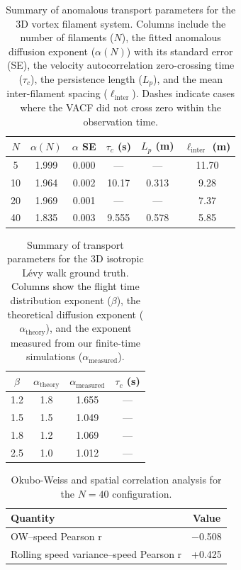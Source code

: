 \documentclass[]{article}
\begin{document}
\begin{table}[h!]
\centering
\caption{Summary of anomalous transport parameters for the 3D vortex filament system. Columns include the number of filaments ($N$), the fitted anomalous diffusion exponent ($\alpha(N)$) with its standard error (SE), the velocity autocorrelation zero-crossing time ($\tau_c$), the persistence length ($L_p$), and the mean inter-filament spacing ($\ell_{\text{inter}}$). Dashes indicate cases where the VACF did not cross zero within the observation time.}
\label{tab:params_vortex}
\begin{tabular}{cccccc}
\hline
$N$ & $\alpha(N)$ & $\alpha$ SE & $\tau_c$ (s) & $L_p$ (m) & $\ell_{\text{inter}}$ (m) \\
\hline
5  & 1.999 & 0.000 & —     & —     & 11.70 \\
10 & 1.964 & 0.002 & 10.17 & 0.313 & 9.28  \\
20 & 1.969 & 0.001 & —     & —     & 7.37  \\
40 & 1.835 & 0.003 & 9.555 & 0.578 & 5.85  \\
\hline
\end{tabular}
\end{table}

\begin{table}[h!]
\centering
\caption{Summary of transport parameters for the 3D isotropic L\'evy walk ground truth. Columns show the flight time distribution exponent ($\beta$), the theoretical diffusion exponent ($\alpha_{\text{theory}}$), and the exponent measured from our finite-time simulations ($\alpha_{\text{measured}}$).}
\label{tab:params_levy}
\begin{tabular}{cccc}
\hline
$\beta$ & $\alpha_{\text{theory}}$ & $\alpha_{\text{measured}}$ & $\tau_c$ (s) \\
\hline
1.2 & 1.8 & 1.655 & — \\
1.5 & 1.5 & 1.049 & — \\
1.8 & 1.2 & 1.069 & — \\
2.5 & 1.0 & 1.012 & — \\
\hline
\end{tabular}
\end{table}

\begin{table}[h!]
\centering
\caption{Okubo-Weiss and spatial correlation analysis for the $N=40$ configuration.}
\label{tab:params_ow}
\begin{tabular}{lc}
\hline
Quantity & Value \\
\hline
OW–speed Pearson r & −0.508 \\
Rolling speed variance–speed Pearson r & +0.425 \\
\hline
\end{tabular}
\end{table}
\end{document}

